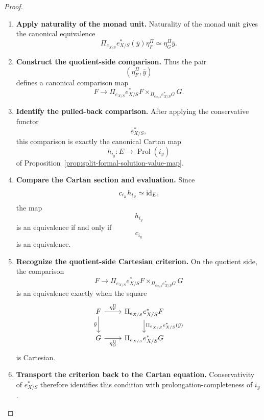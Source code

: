 \begin{proof}
\begin{enumerate}[label=\textup{(\arabic*)}]
    \item \textbf{Apply naturality of the monad unit.}
Naturality of the monad unit gives the canonical equivalence
\[
  \Pi_{e_{X/S}}e_{X/S}^*(\bar y)\eta^\Pi_F
  \simeq
  \eta^\Pi_G\bar y.
\]

    \item \textbf{Construct the quotient-side comparison.}
Thus the pair
\[
  (\eta^\Pi_F,\bar y)
\]
defines a canonical comparison map
\[
  F\longrightarrow
  \Pi_{e_{X/S}}e_{X/S}^*F
  \times_{\Pi_{e_{X/S}}e_{X/S}^*G}
  G.
\]

    \item \textbf{Identify the pulled-back comparison.}
After applying the conservative functor
\[
  e_{X/S}^*,
\]
this comparison is exactly the canonical Cartan map
\[
  h_{i_y}:E\longrightarrow \operatorname{Prol}(i_y)
\]
of Proposition~\ref{prop:split-formal-solution-value-map}.

    \item \textbf{Compare the Cartan section and evaluation.}
Since
\[
  c_{i_y}h_{i_y}\simeq\operatorname{id}_E,
\]
the map
\[
  h_{i_y}
\]
is an equivalence if and only if
\[
  c_{i_y}
\]
is an equivalence.

    \item \textbf{Recognize the quotient-side Cartesian criterion.}
On the quotient side, the comparison
\[
  F\longrightarrow
  \Pi_{e_{X/S}}e_{X/S}^*F
  \times_{\Pi_{e_{X/S}}e_{X/S}^*G}
  G
\]
is an equivalence exactly when the square
\[
\begin{tikzcd}
F \ar[r,"\eta^\Pi_F"] \ar[d,"\bar y"']
  & \Pi_{e_{X/S}}e_{X/S}^*F
      \ar[d,"\Pi_{e_{X/S}}e_{X/S}^*(\bar y)"]\\
G \ar[r,"\eta^\Pi_G"']
  & \Pi_{e_{X/S}}e_{X/S}^*G
\end{tikzcd}
\]
is Cartesian.

    \item \textbf{Transport the criterion back to the Cartan equation.}
Conservativity of
\(e_{X/S}^*\) therefore identifies this condition with
prolongation-completeness of \(i_y\).
\end{enumerate}
\end{proof}


